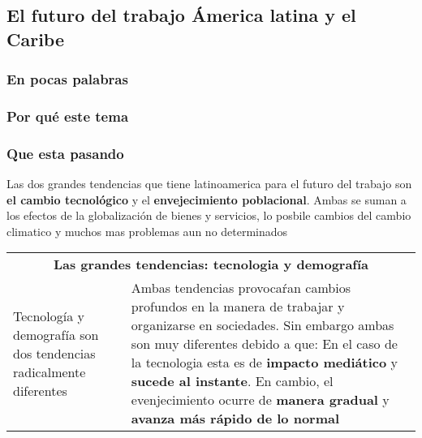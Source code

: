 \subsection{El futuro del trabajo Ámerica latina y el Caribe}
\subsubsection{En pocas palabras}
\subsubsection{Por qué este tema}
\subsubsection{Que esta pasando}
Las dos grandes tendencias que tiene latinoamerica para el futuro del trabajo son {\bf el cambio tecnológico} y el {\bf envejecimiento poblacional}. Ambas se suman a los efectos de la globalización de bienes y servicios, lo posbile cambios del cambio climatico y muchos mas problemas aun no determinados

\begingroup
\setlength{\tabcolsep}{12pt} %
\renewcommand{\arraystretch}{1.5} %
\begin{tabular}{p{4cm}|p{11cm}}
\multicolumn{2}{c}{\large \bf Las grandes tendencias: tecnologia y demografía}  \\
Tecnología y demografía son dos tendencias radicalmente diferentes&Ambas tendencias provocaŕan cambios profundos en la manera de trabajar y organizarse en sociedades. Sin embargo ambas son muy diferentes debido a que: En el caso de la tecnologia esta es de {\bf impacto mediático} y {\bf sucede al instante}. En cambio, el evenjecimiento ocurre de {\bf manera gradual} y {\bf avanza más rápido de lo normal}\\ 
\end{tabular}
\endgroup


